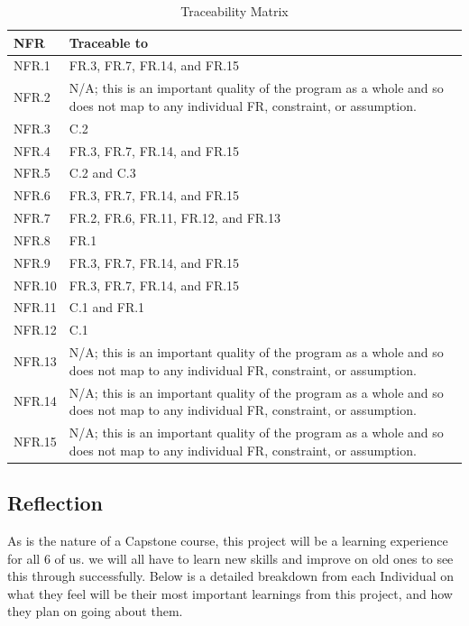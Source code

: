 \documentclass[12pt]{article}
\begin{document}
\begin{table}[H]
\caption{Traceability Matrix} \label{TblTraceabilityMatrix}
\begin{tabular}{p{}|p{}|}
\toprule
\textbf{NFR} & \textbf{Traceable to}\\
\midrule
NFR.1 & FR.3, FR.7, FR.14, and FR.15\\
\midrule
NFR.2 & N/A; this is an important quality of the program as a whole and so does not map to any individual FR, constraint, or assumption.\\
\midrule
NFR.3 & C.2\\
\midrule
NFR.4 & FR.3, FR.7, FR.14, and FR.15\\
\midrule
NFR.5 & C.2 and C.3\\
\midrule
NFR.6 & FR.3, FR.7, FR.14, and FR.15\\
\midrule
NFR.7 & FR.2, FR.6, FR.11, FR.12, and FR.13\\
\midrule
NFR.8 & FR.1\\
\midrule
NFR.9 & FR.3, FR.7, FR.14, and FR.15\\
\midrule
NFR.10 & FR.3, FR.7, FR.14, and FR.15\\
\midrule
NFR.11 & C.1 and FR.1\\
\midrule
NFR.12 & C.1\\
\midrule
NFR.13 & N/A; this is an important quality of the program as a whole and so does not map to any individual FR, constraint, or assumption.\\
\midrule
NFR.14 & N/A; this is an important quality of the program as a whole and so does not map to any individual FR, constraint, or assumption.\\
\midrule
NFR.15 & N/A; this is an important quality of the program as a whole and so does not map to any individual FR, constraint, or assumption.\\
\bottomrule
\end{tabular}
\end{table}

\subsection{Reflection}

As is the nature of a Capstone course, this project will be a learning experience for all 6 of us. we will all have to learn new skills and improve on old ones to see this 
through successfully. Below is a detailed breakdown from each Individual on what they feel will be their most important learnings from this project, and how they plan on
going about them.
\end{document}
